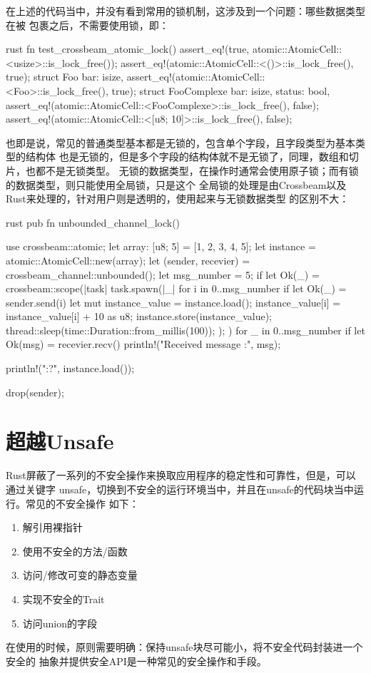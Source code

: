 在上述的代码当中，并没有看到常用的锁机制，这涉及到一个问题：哪些数据类型在被
包裹之后，不需要使用锁，即：
\begin{code-block}{rust}
fn test_crossbeam_atomic_lock() {
    assert_eq!(true, atomic::AtomicCell::<usize>::is_lock_free());
    assert_eq!(atomic::AtomicCell::<()>::is_lock_free(), true);
    struct Foo {
        bar: isize,
    }
    assert_eq!(atomic::AtomicCell::<Foo>::is_lock_free(), true);
    struct FooComplexe {
        bar: isize,
        status: bool,
    }
    assert_eq!(atomic::AtomicCell::<FooComplexe>::is_lock_free(), false);
    assert_eq!(atomic::AtomicCell::<[u8; 10]>::is_lock_free(), false);
}
\end{code-block}
也即是说，常见的普通类型基本都是无锁的，包含单个字段，且字段类型为基本类型的结构体
也是无锁的，但是多个字段的结构体就不是无锁了，同理，数组和切片，也都不是无锁类型。
无锁的数据类型，在操作时通常会使用原子锁；而有锁的数据类型，则只能使用全局锁，只是这个
全局锁的处理是由Crossbeam以及Rust来处理的，针对用户则是透明的，使用起来与无锁数据类型
的区别不大：
\begin{code-block}{rust}
pub fn unbounded_channel_lock() {
    use crossbeam::atomic;
    let array: [u8; 5] = [1, 2, 3, 4, 5];
    let instance = atomic::AtomicCell::new(array);
    let (sender, recevier) = crossbeam_channel::unbounded();
    let msg_number = 5;
    if let Ok(_) = crossbeam::scope(|task| {
        task.spawn(|_| {
            for i in 0..msg_number {
                if let Ok(_) = sender.send(i) {
                    let mut instance_value = instance.load();
                    instance_value[i] = instance_value[i] + 10 as u8;
                    instance.store(instance_value);
                    thread::sleep(time::Duration::from_millis(100));
                }
            }
        });
    }) {
        for _ in 0..msg_number {
            if let Ok(msg) = recevier.recv() {
                println!("Received message :{}", msg);
            }
        }
    }

    println!("{:?}", instance.load());

    drop(sender);
}
\end{code-block}

\section{超越Unsafe}
Rust屏蔽了一系列的不安全操作来换取应用程序的稳定性和可靠性，但是，可以通过关键字
unsafe，切换到不安全的运行环境当中，并且在unsafe的代码块当中运行。常见的不安全操作
如下：
\begin{enumerate}
  \item 解引用裸指针
  \item 使用不安全的方法/函数
  \item 访问/修改可变的静态变量
  \item 实现不安全的Trait
  \item 访问union的字段
\end{enumerate}
在使用的时候，原则需要明确：保持unsafe块尽可能小，将不安全代码封装进一个安全的
抽象并提供安全API是一种常见的安全操作和手段。

